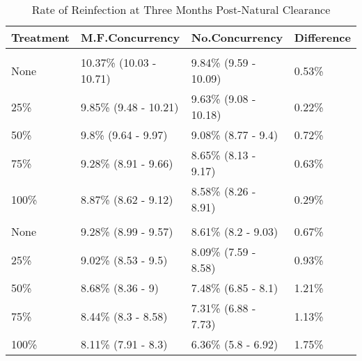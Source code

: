 \documentclass [11pt, proquest] {uwthesis}[2015/03/03]
\begin{document}
\begin{table}

\caption{\label{tab:natclear2}Rate of Reinfection at Three Months Post-Natural Clearance}
\centering
\begin{tabular}[t]{llll}
\toprule
Treatment & M.F.Concurrency & No.Concurrency & Difference\\
\midrule
\addlinespace[0.3em]
\multicolumn{4}{l}{\textbf{Females}}\\
\hspace{1em}None & 10.37\% (10.03 - 10.71) & 9.84\% (9.59 - 10.09) & 0.53\%\\
\hspace{1em}25\% & 9.85\% (9.48 - 10.21) & 9.63\% (9.08 - 10.18) & 0.22\%\\
\hspace{1em}50\% & 9.8\% (9.64 - 9.97) & 9.08\% (8.77 - 9.4) & 0.72\%\\
\hspace{1em}75\% & 9.28\% (8.91 - 9.66) & 8.65\% (8.13 - 9.17) & 0.63\%\\
\hspace{1em}100\% & 8.87\% (8.62 - 9.12) & 8.58\% (8.26 - 8.91) & 0.29\%\\
\addlinespace[0.3em]
\multicolumn{4}{l}{\textbf{Males}}\\
\hspace{1em}None & 9.28\% (8.99 - 9.57) & 8.61\% (8.2 - 9.03) & 0.67\%\\
\hspace{1em}25\% & 9.02\% (8.53 - 9.5) & 8.09\% (7.59 - 8.58) & 0.93\%\\
\hspace{1em}50\% & 8.68\% (8.36 - 9) & 7.48\% (6.85 - 8.1) & 1.21\%\\
\hspace{1em}75\% & 8.44\% (8.3 - 8.58) & 7.31\% (6.88 - 7.73) & 1.13\%\\
\hspace{1em}100\% & 8.11\% (7.91 - 8.3) & 6.36\% (5.8 - 6.92) & 1.75\%\\
\bottomrule
\end{tabular}
\end{table}
\end{document}
